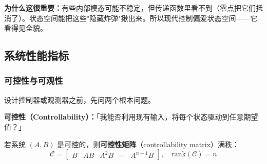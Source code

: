 \textbf{为什么这很重要：}有些内部模态可能不稳定，但传递函数里看不到（零点把它们抵消了）。状态空间能把这些"隐藏炸弹"揪出来。所以现代控制偏爱状态空间——它看得见全貌。

\subsection{系统性能指标}

\subsubsection{可控性与可观性}

设计控制器或观测器之前，先问两个根本问题。

\textbf{可控性（Controllability）：}「我能否利用现有输入，将每个状态驱动到任意期望值？」

若系统 $(A, B)$ 是可控的，则\textbf{可控性矩阵}（controllability matrix）满秩：
\begin{equation}
\mathcal{C} = \begin{bmatrix} B & AB & A^2B & \cdots & A^{n-1}B \end{bmatrix}, \quad \text{rank}(\mathcal{C}) = n
\end{equation}

